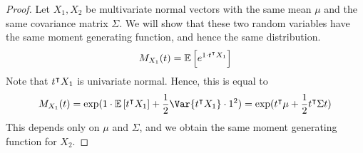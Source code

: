 \begin{proof}
	Let $X_1, X_2$ be multivariate normal vectors with the same mean $\mu$ and the same covariance matrix $\Sigma$.
	We will show that these two random variables have the same moment generating function, and hence the same distribution.
	\begin{align*}
		M_{X_1}(t) = \mathbb{E}\left[{ e^{1 \cdot t^\intercal X_1} }\right]
	\end{align*}
	Note that $t^\intercal X_1$ is univariate normal.
	Hence, this is equal to
	\begin{align*}
		M_{X_1}(t) = \exp(1 \cdot \expect{t^\tran X_1} + \frac{1}{2} \Var{t^\tran X_1} \cdot 1^2) = \exp(t^\tran \mu + \frac{1}{2} t^\tran \Sigma t)
	\end{align*}
	This depends only on $\mu$ and $\Sigma$, and we obtain the same moment generating function for $X_2$.
\end{proof}

